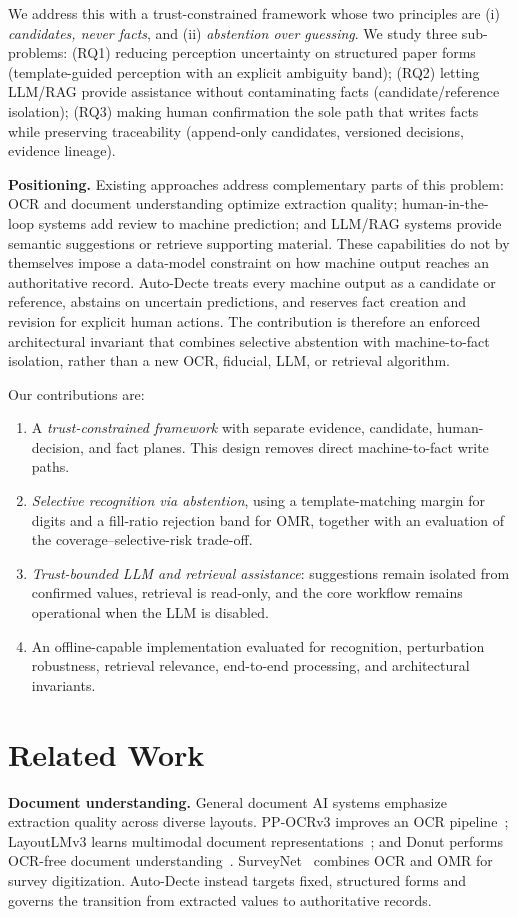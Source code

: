 \documentclass[runningheads]{llncs}
\begin{document}
We address this with a trust-constrained framework whose two principles are (i) \emph{candidates, never facts}, and (ii) \emph{abstention over guessing}. We study three sub-problems: (RQ1) reducing perception uncertainty on structured paper forms (template-guided perception with an explicit ambiguity band); (RQ2) letting LLM/RAG provide assistance without contaminating facts (candidate/reference isolation); (RQ3) making human confirmation the sole path that writes facts while preserving traceability (append-only candidates, versioned decisions, evidence lineage).

\textbf{Positioning.} Existing approaches address complementary parts of this problem: OCR and document understanding optimize extraction quality; human-in-the-loop systems add review to machine prediction; and LLM/RAG systems provide semantic suggestions or retrieve supporting material. These capabilities do not by themselves impose a data-model constraint on how machine output reaches an authoritative record. Auto-Decte treats every machine output as a candidate or reference, abstains on uncertain predictions, and reserves fact creation and revision for explicit human actions. The contribution is therefore an enforced architectural invariant that combines selective abstention with machine-to-fact isolation, rather than a new OCR, fiducial, LLM, or retrieval algorithm.

Our contributions are:
\begin{enumerate}
\item A \emph{trust-constrained framework} with separate evidence, candidate, human-decision, and fact planes. This design removes direct machine-to-fact write paths.
\item \emph{Selective recognition via abstention}, using a template-matching margin for digits and a fill-ratio rejection band for OMR, together with an evaluation of the coverage--selective-risk trade-off.
\item \emph{Trust-bounded LLM and retrieval assistance}: suggestions remain isolated from confirmed values, retrieval is read-only, and the core workflow remains operational when the LLM is disabled.
\item An offline-capable implementation evaluated for recognition, perturbation robustness, retrieval relevance, end-to-end processing, and architectural invariants.
\end{enumerate}

\section{Related Work}
\textbf{Document understanding.} General document AI systems emphasize extraction quality across diverse layouts. PP-OCRv3 improves an OCR pipeline~\cite{ppocrv3}; LayoutLMv3 learns multimodal document representations~\cite{layoutlmv3}; and Donut performs OCR-free document understanding~\cite{donut}. SurveyNet~\cite{surveynet} combines OCR and OMR for survey digitization. Auto-Decte instead targets fixed, structured forms and governs the transition from extracted values to authoritative records.
\end{document}
